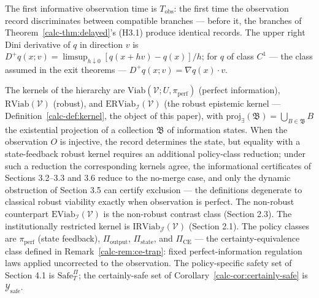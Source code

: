 \documentclass[10pt,twocolumn]{article}
\theoremstyle{definition}
\begin{document}
The first informative observation
time is \(T_{\mathrm{obs}}\): the first time the observation record
discriminates between compatible branches --- before it, the branches of
Theorem~\ref{calc-thm:delayed}'s (H3.1) produce identical records. The upper
right Dini derivative of \(q\) in direction \(v\) is
\(D^+ q(x; v) = \limsup_{h \downarrow 0} [q(x + hv) - q(x)]/h\); for
\(q\) of class \(C^1\) --- the class assumed in the exit theorems ---
\(D^+ q(x; v) = \nabla q(x) \cdot v\).

The kernels of the hierarchy are
\(\mathrm{Viab}(\mathcal{V}; U, \pi_{\mathrm{perf}})\) (perfect
information), \(\mathrm{RViab}(\mathcal{V})\) (robust), and
\(\mathrm{ERViab}_{\mathcal{I}}(\mathcal{V})\) (the robust epistemic
kernel --- Definition~\ref{calc-def:kernel}, the object of this paper), with
\(\mathrm{proj}_{\exists}(\mathfrak{B}) = \bigcup_{B \in \mathfrak{B}} B\)
the existential projection of a collection \(\mathfrak{B}\) of information states. When the observation \(O\) is injective, the record determines the state, but equality with a state-feedback robust kernel requires an additional policy-class reduction; under such a reduction the corresponding kernels agree, the informational certificates of Sections 3.2--3.3 and 3.6 reduce to the no-merge case, and only the dynamic obstruction of Section 3.5 can certify exclusion --- the definitions degenerate to classical robust viability exactly when observation is perfect. The non-robust counterpart
\(\mathrm{EViab}_{\mathcal{I}}(\mathcal{V})\) is the non-robust contrast class (Section 2.3). The institutionally restricted kernel is \(\mathrm{IRViab}_{\mathcal{J}}(\mathcal{V})\) (Section 2.1). The policy classes
are \(\pi_{\mathrm{perf}}\) (state feedback), \(\Pi_{\mathrm{output}}\),
\(\Pi_{\mathrm{state}}\), and \(\Pi_{\mathrm{CE}}\) --- the
certainty-equivalence class defined in Remark~\ref{calc-rem:ce-trap}: fixed
perfect-information regulation laws applied uncorrected to the
observation. The policy-specific safety set of Section 4.1 is
\(\mathrm{Safe}^{\Pi}_T\); the certainly-safe set of Corollary~\ref{calc-cor:certainly-safe} is
\(\mathcal{Y}_{\mathrm{safe}}\).
\end{document}
